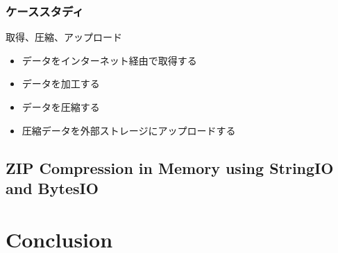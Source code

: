 \documentclass[dvipdfmx,12pt,notheorems]{beamer}
\theoremstyle{definition}
\begin{document}
\begin{frame}\frametitle{ケーススタディ}
\begin{block}{取得、圧縮、アップロード}
\begin{itemize}
\item データをインターネット経由で取得する
\item データを加工する
\item データを圧縮する
\item 圧縮データを外部ストレージにアップロードする
\end{itemize}
\end{block}
\end{frame}

\subsection{ZIP Compression in Memory using StringIO and BytesIO}

\section{Conclusion}
\end{document}
